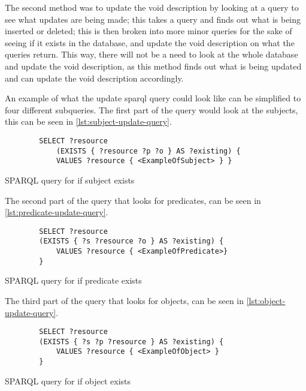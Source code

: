 The second method was to update the \gls{void} description by looking at a query to see what updates are being made; this takes a query and finds out what is being inserted or deleted; this is then broken into more minor queries for the sake of seeing if it exists in the database, and update the \gls{void} description on what the queries return. This way, there will not be a need to look at the whole database and update the \gls{void} description, as this method finds out what is being updated and can update the \gls{void} description accordingly.

An example of what the update \gls{sparql} query could look like can be simplified to four different subqueries. The first part of the query would look at the subjects, this can be seen in \autoref{lst:subject-update-query}.

\begin{listing}[!ht]
    \begin{verbatim}          
        SELECT ?resource
            (EXISTS { ?resource ?p ?o } AS ?existing) {
            VALUES ?resource { <ExampleOfSubject> } }
    \end{verbatim}
    \caption{SPARQL query for if subject exists}
    \label{lst:subject-update-query}
\end{listing}

The second part of the query that looks for predicates, can be seen in \autoref{lst:predicate-update-query}.
\begin{listing}[!ht]
    \begin{verbatim}          
        SELECT ?resource 
        (EXISTS { ?s ?resource ?o } AS ?existing) { 
            VALUES ?resource { <ExampleOfPredicate>}
        } 
    \end{verbatim}
    \caption{SPARQL query for if predicate exists}
    \label{lst:predicate-update-query}
\end{listing}


The third part of the query that looks for objects, can be seen in \autoref{lst:object-update-query}.

\begin{listing}[!ht]
    \begin{verbatim}          
        SELECT ?resource 
        (EXISTS { ?s ?p ?resource } AS ?existing) { 
            VALUES ?resource { <ExampleOfObject> } 
        }
    \end{verbatim}
    \caption{SPARQL query for if object exists}
    \label{lst:object-update-query}
\end{listing}

